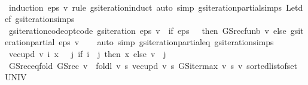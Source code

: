\begin{isabellebody}
\ \ %
\endisadelimproof
%
\isatagproof
{}\isamarkupfalse%
\ {\isacharparenleft}{\kern0pt}induction\ eps\ v\ rule{\isacharcolon}{\kern0pt}\ gs{\isacharunderscore}{\kern0pt}iteration{\isachardot}{\kern0pt}induct{\isacharparenright}{\kern0pt}\ {\isacharparenleft}{\kern0pt}auto\ simp{\isacharcolon}{\kern0pt}\ gs{\isacharunderscore}{\kern0pt}iteration{\isacharunderscore}{\kern0pt}partial{\isachardot}{\kern0pt}simps\ Let{\isacharunderscore}{\kern0pt}def\ gs{\isacharunderscore}{\kern0pt}iteration{\isachardot}{\kern0pt}simps{\isacharparenright}{\kern0pt}%
\endisatagproof
{\isafoldproof}%
%
\isadelimproof
\isanewline
%
\endisadelimproof
\isanewline
{}\isamarkupfalse%
\ gs{\isacharunderscore}{\kern0pt}iteration{\isacharunderscore}{\kern0pt}code{\isacharunderscore}{\kern0pt}opt{\isacharbrackleft}{\kern0pt}code{\isacharbrackright}{\kern0pt}{\isacharcolon}{\kern0pt}\ {\isachardoublequoteopen}gs{\isacharunderscore}{\kern0pt}iteration\ eps\ v\ {\isacharequal}{\kern0pt}\ {\isacharparenleft}{\kern0pt}if\ eps\ {\isasymle}\ {}\ then\ GS{\isacharunderscore}{\kern0pt}rec{\isacharunderscore}{\kern0pt}fun\isactrlsub b\ v\ else\ gs{\isacharunderscore}{\kern0pt}iteration{\isacharunderscore}{\kern0pt}partial\ eps\ v{\isacharparenright}{\kern0pt}{\isachardoublequoteclose}\isanewline
%
\isadelimproof
\ \ %
\endisadelimproof
%
\isatagproof
{}\isamarkupfalse%
\ {\isacharparenleft}{\kern0pt}auto\ simp{\isacharcolon}{\kern0pt}\ gs{\isacharunderscore}{\kern0pt}iteration{\isacharunderscore}{\kern0pt}partial{\isacharunderscore}{\kern0pt}eq\ gs{\isacharunderscore}{\kern0pt}iteration{\isachardot}{\kern0pt}simps{\isacharparenright}{\kern0pt}%
\endisatagproof
{\isafoldproof}%
%
\isadelimproof
\isanewline
%
\endisadelimproof
\isanewline
{}\isamarkupfalse%
\ {\isachardoublequoteopen}vec{\isacharunderscore}{\kern0pt}upd\ v\ i\ x\ {\isacharequal}{\kern0pt}\ {\isacharparenleft}{\kern0pt}{\isasymchi}\ j{\isachardot}{\kern0pt}\ if\ i\ {\isacharequal}{\kern0pt}\ j\ then\ x\ else\ v\ {\isachardollar}{\kern0pt}\ j{\isacharparenright}{\kern0pt}{\isachardoublequoteclose}\isanewline
\isanewline
{}\isamarkupfalse%
\ GS{\isacharunderscore}{\kern0pt}rec{\isacharunderscore}{\kern0pt}eq{\isacharunderscore}{\kern0pt}fold{\isacharcolon}{\kern0pt}\ {\isachardoublequoteopen}GS{\isacharunderscore}{\kern0pt}rec\ v\ {\isacharequal}{\kern0pt}\ foldl\ {\isacharparenleft}{\kern0pt}{\isasymlambda}v\ s{\isachardot}{\kern0pt}\ {\isacharparenleft}{\kern0pt}vec{\isacharunderscore}{\kern0pt}upd\ v\ s\ {\isacharparenleft}{\kern0pt}GS{\isacharunderscore}{\kern0pt}iter{\isacharunderscore}{\kern0pt}max\ v\ s{\isacharparenright}{\kern0pt}{\isacharparenright}{\kern0pt}{\isacharparenright}{\kern0pt}\ v\ {\isacharparenleft}{\kern0pt}sorted{\isacharunderscore}{\kern0pt}list{\isacharunderscore}{\kern0pt}of{\isacharunderscore}{\kern0pt}set\ UNIV{\isacharparenright}{\kern0pt}{\isachardoublequoteclose}\isanewline

\end{isabellebody}
